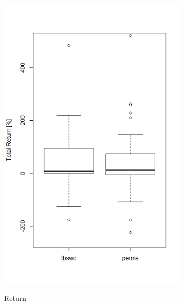 \begin{figure}[h]
\centering
\begin{subfigure}{.5\textwidth}
  \centering
  \includegraphics[width=\linewidth]{boxplotReturn}
  \label{fig_returnBoxplot}
  \caption{Return}
\end{subfigure}%
\begin{subfigure}{.5\textwidth}
  \centering

\end{subfigure}
\end{figure}
